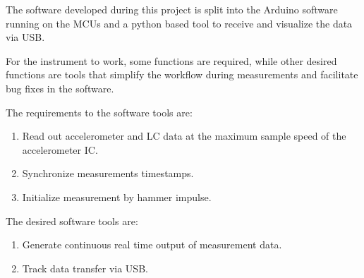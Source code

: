 The software developed during this project is split into the Arduino software running on the \acs{MCU}s and a python based tool to receive and visualize the data via \ac{USB}.

For the instrument to work, some functions are required, while other desired functions are tools that simplify the workflow during measurements and facilitate bug fixes in the software.

The requirements to the software tools are:
\begin{enumerate}[label=\emph{m\arabic*}, itemindent=3em, labelsep=2em]
    \item Read out accelerometer and \ac{LC} data at the maximum sample speed of the accelerometer \ac{IC}.\label{req:read_out}
    \item Synchronize measurements timestamps.\label{req:sync}
    \item Initialize measurement by hammer impulse.\label{req:init}
\end{enumerate}

The desired software tools are:
\begin{enumerate}[label=\emph{w\arabic*}, itemindent=3em, labelsep=2em]
    \item Generate continuous real time output of measurement data.\label{des:cont_out}
    \item Track data transfer via \ac{USB}.\label{des:dat_track}
\end{enumerate}



